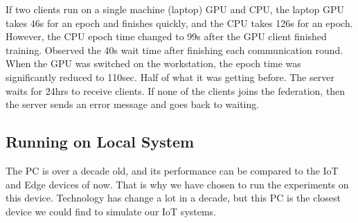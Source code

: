 \documentclass[conference]{IEEEtran}
\begin{document}
If two clients run on a single machine (laptop) GPU and CPU, the laptop GPU takes 46s for an epoch and finishes quickly, and the CPU takes 126s for an epoch. However, the CPU epoch time changed to 99s after the GPU client finished training. Observed the 40s wait time after finishing each communication round. When the GPU was switched on the workstation, the epoch time was significantly reduced to 110sec. Half of what it was getting before. The server waits for 24hrs to receive clients. If none of the clients joins the federation, then the server sends an error message and goes back to waiting.

\subsection{Running on Local System}
The PC is over a decade old, and its performance can be compared to the IoT and Edge devices of now. That is why we have chosen to run the experiments on this device. Technology has change a lot in a decade, but this PC is the closest device we could find to simulate our IoT systems. 
\end{document}
